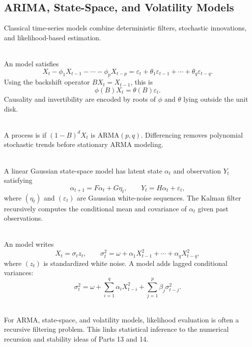 \subsection{ARIMA, State-Space, and Volatility Models}

Classical time-series models combine deterministic filters, stochastic innovations, and likelihood-based estimation.

\begin{definition} \label{def:arma-model} \\
An  model satisfies
\[
X_t-\phi_1X_{t-1}-\cdots-\phi_pX_{t-p}
=\varepsilon_t+\theta_1\varepsilon_{t-1}+\cdots+\theta_q\varepsilon_{t-q}.
\]
Using the backshift operator $B X_t=X_{t-1}$, this is
\[
\phi(B)X_t=\theta(B)\varepsilon_t.
\]
Causality and invertibility are encoded by roots of $\phi$ and $\theta$ lying outside the unit disk.
\end{definition}

\begin{definition} \label{def:arima-model} \\
A process is  if $(1-B)^dX_t$ is ARMA$(p,q)$.  Differencing removes polynomial stochastic trends before stationary ARMA modeling.
\end{definition}

\begin{definition} \label{def:state-space-model-kalman} \\
A linear Gaussian state-space model has latent state $\alpha_t$ and observation $Y_t$ satisfying
\[
\alpha_{t+1}=F\alpha_t+G\eta_t,
\qquad
Y_t=H\alpha_t+\varepsilon_t,
\]
where $(\eta_t)$ and $(\varepsilon_t)$ are Gaussian white-noise sequences.  The Kalman filter recursively computes the conditional mean and covariance of $\alpha_t$ given past observations.
\end{definition}

\begin{definition} \label{def:arch-garch-models} \\
An  model writes
\[
X_t=\sigma_t z_t,
\qquad
\sigma_t^2=\omega+\alpha_1X_{t-1}^2+\cdots+\alpha_qX_{t-q}^2,
\]
where $(z_t)$ is standardized white noise.  A  model adds lagged conditional variances:
\[
\sigma_t^2=\omega+\sum_{i=1}^q\alpha_iX_{t-i}^2+\sum_{j=1}^p\beta_j\sigma_{t-j}^2.
\]
\end{definition}

\begin{remark} \label{rem:time-series-likelihood-filtering} \\
For ARMA, state-space, and volatility models, likelihood evaluation is often a recursive filtering problem.  This links statistical inference to the numerical recursion and stability ideas of Parts 13 and 14.
\end{remark}
